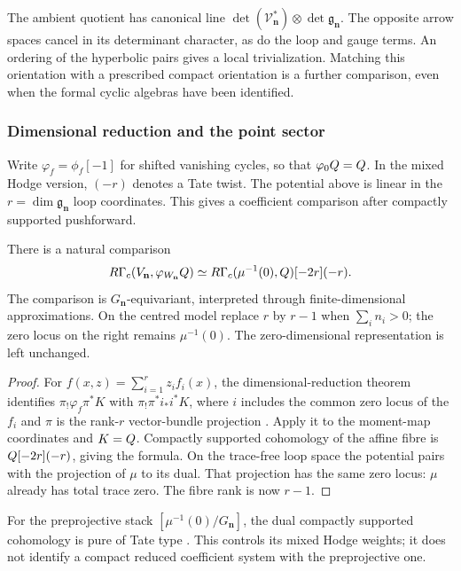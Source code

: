 The ambient quotient has canonical line
$\det(\mathcal V_{\mathbf n}^*)\otimes\det\mathfrak g_{\mathbf n}$.
The opposite arrow spaces cancel in its determinant character, as do
the loop and gauge terms. An ordering of the hyperbolic pairs gives
a local trivialization. Matching this orientation with a prescribed
compact orientation is a further comparison, even when the formal
cyclic algebras have been identified.

\subsubsection*{Dimensional reduction and the point sector}

Write $\varphi_f=\phi_f[-1]$ for shifted vanishing cycles, so that
$\varphi_0Q=Q$. In the mixed Hodge version, $(-r)$ denotes a
Tate twist. The potential above is linear in the $r=\dim\mathfrak
g_{\mathbf n}$ loop coordinates. This gives a coefficient
comparison after compactly supported pushforward.

\begin{proposition}
\label{hall:prop:dimensional-reduction}
There is a natural comparison
\[
 R\Gamma_c(V_{\mathbf n},
                 \varphi_{W_{\mathbf n}}Q)
 \simeq R\Gamma_c(\mu^{-1}(0),Q)[-2r](-r).
\]
The comparison is $G_{\mathbf n}$-equivariant, interpreted through
finite-dimensional approximations. On the centred model replace
$r$ by $r-1$ when $\sum_i n_i>0$; the zero locus on the right
remains $\mu^{-1}(0)$. The zero-dimensional representation is
left unchanged.
\end{proposition}

\begin{proof}
For $f(x,z)=\sum_{i=1}^r z_if_i(x)$, the dimensional-reduction
theorem identifies $\pi_!\varphi_f\pi^*K$ with
$\pi_!\pi^*i_*i^*K$, where $i$ includes the common zero locus
of the $f_i$ and $\pi$ is the rank-$r$ vector-bundle projection
\cite[Theorem~A.1 and Corollary~A.9]{DavisonCriticalCoHA}.
Apply it to the moment-map coordinates and $K=Q$.
Compactly supported cohomology of the affine fibre is
$Q[-2r](-r)$, giving the formula. On the trace-free loop space
the potential pairs with the projection of $\mu$ to its dual.
That projection has the same zero locus: $\mu$ already has
total trace zero. The fibre rank is now $r-1$.
\end{proof}

For the preprojective stack
$[\mu^{-1}(0)/G_{\mathbf n}]$, the dual compactly supported
cohomology is pure of Tate type \cite[Theorem~A]{Davison2017}.
This controls its mixed Hodge weights; it does not identify a
compact reduced coefficient system with the preprojective one.

